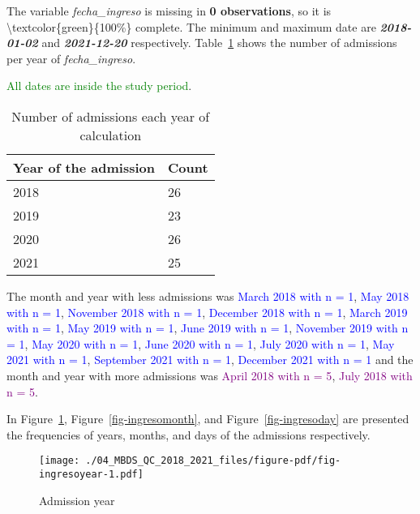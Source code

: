 \documentclass[
  letterpaper,
  DIV=11,
  numbers=noendperiod]{scrreprt}
\begin{document}
The variable \emph{fecha\_ingreso} is missing in \textbf{0
observations}, so it is \textbackslash textcolor\{green\}\{100\%\}
complete. The minimum and maximum date are \textbf{\emph{2018-01-02}}
and \textbf{\emph{2021-12-20}} respectively. Table~\ref{tbl-fechaing}
shows the number of admissions per year of \emph{fecha\_ingreso}.

\textcolor{green}{All dates are inside the study period}.

\hypertarget{tbl-fechaing}{}
\begin{longtable}{ll}
\caption{\label{tbl-fechaing}Number of admissions each year of calculation }\tabularnewline

\toprule
Year of the admission & Count \\ 
\midrule
2018 & 26 \\ 
2019 & 23 \\ 
2020 & 26 \\ 
2021 & 25 \\ 
\bottomrule
\end{longtable}

The month and year with less admissions was
\textcolor{blue}{March 2018 with n = 1},
\textcolor{blue}{May 2018 with n = 1},
\textcolor{blue}{November 2018 with n = 1},
\textcolor{blue}{December 2018 with n = 1},
\textcolor{blue}{March 2019 with n = 1},
\textcolor{blue}{May 2019 with n = 1},
\textcolor{blue}{June 2019 with n = 1},
\textcolor{blue}{November 2019 with n = 1},
\textcolor{blue}{May 2020 with n = 1},
\textcolor{blue}{June 2020 with n = 1},
\textcolor{blue}{July 2020 with n = 1},
\textcolor{blue}{May 2021 with n = 1},
\textcolor{blue}{September 2021 with n = 1},
\textcolor{blue}{December 2021 with n = 1} and the month and year with
more admissions was \textcolor{purple}{April 2018 with n = 5},
\textcolor{purple}{July 2018 with n = 5}.

In Figure~\ref{fig-ingresoyear}, Figure~\ref{fig-ingresomonth}, and
Figure~\ref{fig-ingresoday} are presented the frequencies of years,
months, and days of the admissions respectively.

\begin{figure}

{\centering \texttt{[image: ./04\_MBDS\_QC\_2018\_2021\_files/figure-pdf/fig-ingresoyear-1.pdf]}

}

\caption{\label{fig-ingresoyear}Admission year}

\end{figure}
\end{document}
